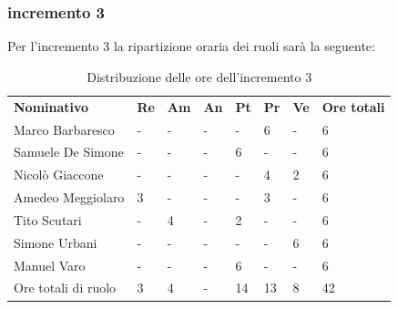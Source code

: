 \subsubsection{incremento 3}
Per l'incremento 3 la ripartizione oraria dei ruoli sarà la seguente:
\begin{center}
    \begin{table}[ht!]
        \centering
        \caption{Distribuzione delle ore dell'incremento 3}
        \vspace{5px}
        \renewcommand{\arraystretch}{1.8}
        \begin{tabular}{p{100px} p{20px} p{20px} p{20px} p{20px} p{20px} p{20px} p{50px} }
            \rowcolor{logo!70} \textbf{Nominativo} & \textbf{Re} & \textbf{Am} & \textbf{An} & \textbf{Pt} & \textbf{Pr} & \textbf{Ve} & \textbf{Ore totali} \\
            Marco Barbaresco                       & -           & -           & -           & -           & 6           & -           & 6                   \\
            Samuele De Simone                      & -           & -           & -           & 6           & -           & -           & 6                   \\
            Nicolò Giaccone                        & -           & -           & -           & -           & 4           & 2           & 6                   \\
            Amedeo Meggiolaro                      & 3           & -           & -           & -           & 3           & -           & 6                   \\
            Tito Scutari                           & -           & 4           & -           & 2           & -           & -           & 6                   \\
            Simone Urbani                          & -           & -           & -           & -           & -           & 6           & 6                   \\
            Manuel Varo                            & -           & -           & -           & 6           & -           & -           & 6                   \\
            Ore totali di ruolo                    & 3           & 4           & -           & 14          & 13          & 8           & 42                  \\
        \end{tabular}
    \end{table}
\end{center}
